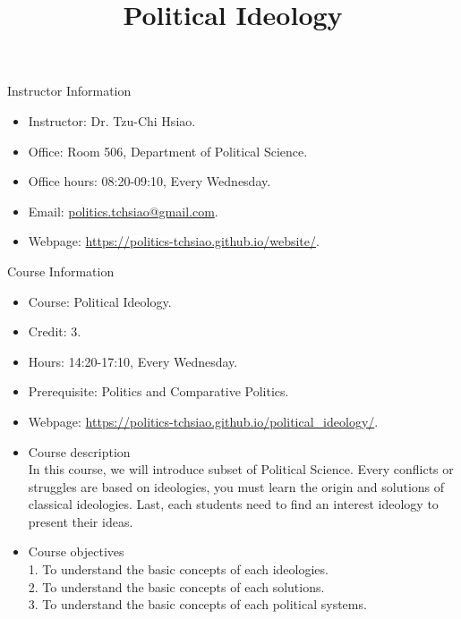 \documentclass{article}
\title{\fontsize{16pt}{16pt}\selectfont Political Ideology}
\author{}
\date{}
\begin{document}
\maketitle
\fontsize{14pt}{14pt}\selectfont
\begin{flushleft}
Instructor Information
\end{flushleft}
\begin{itemize}
\item Instructor: Dr. Tzu-Chi Hsiao. \\
\item Office: Room 506, Department of Political Science. \\
\item Office hours: 08:20-09:10, Every Wednesday. \\
\item Email: \href{mailto:politics.tchsiao@gmail.com}{politics.tchsiao@gmail.com}. \\
\item Webpage: \href{https://politics-tchsiao.github.io/website/}{https://politics-tchsiao.github.io/website/}. \\
\end{itemize}
Course Information \\
\begin{itemize}
\item Course: Political Ideology. \\
\item Credit: 3. \\
\item Hours: 14:20-17:10, Every Wednesday. \\
\item Prerequisite: Politics and Comparative Politics. \\
\item Webpage: \href{https://politics-tchsiao.github.io/political\_ideology/}{https://politics-tchsiao.github.io/political\_ideology/}. \\
\item Course description \\
In this course, we will introduce subset of Political Science. Every conflicts or struggles are based on ideologies, you must learn the origin and solutions of classical ideologies. Last, each students need to find an interest ideology to present their ideas. \\ 
\item Course objectives \\
1. To understand the basic concepts of each ideologies. \\
2. To understand the basic concepts of each solutions. \\
3. To understand the basic concepts of each political systems. \\
\end{itemize}
\end{document}
